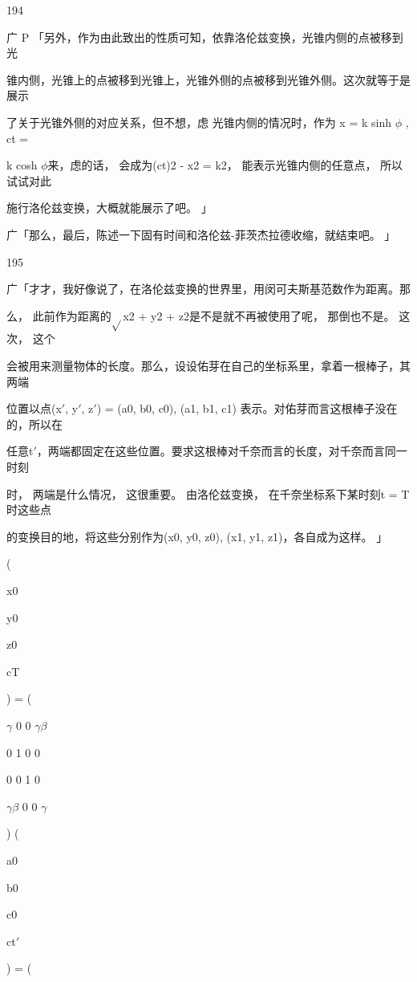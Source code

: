 194\par
广 P 「另外，作为由此致出的性质可知，依靠洛伦兹变换，光锥内侧的点被移到光\par
锥内侧，光锥上的点被移到光锥上，光锥外侧的点被移到光锥外侧。这次就等于是展示\par
了关于光锥外侧的对应关系，但不想，虑 光锥内侧的情况时，作为 x = k sinh $\phi$ , ct =\par
k cosh $\phi$来，虑的话， 会成为(ct)2 - x2 = k2， 能表示光锥内侧的任意点， 所以试试对此\par
施行洛伦兹变换，大概就能展示了吧。 」\par
广「那么，最后，陈述一下固有时间和洛伦兹-菲茨杰拉德收缩，就结束吧。 」\par

195\par
广「才才，我好像说了，在洛伦兹变换的世界里，用闵可夫斯基范数作为距离。那\par
么， 此前作为距离的$\sqrt{}$x2 + y2 + z2是不是就不再被使用了呢， 那倒也不是。 这次， 这个\par
会被用来测量物体的长度。那么，设设佑芽在自己的坐标系里，拿着一根棒子，其两端\par
位置以点(x$\prime$, y$\prime$, z$\prime$) = (a0, b0, c0), (a1, b1, c1) 表示。对佑芽而言这根棒子没在的，所以在\par
任意t$\prime$，两端都固定在这些位置。要求这根棒对千奈而言的长度，对千奈而言同一时刻\par
时， 两端是什么情况， 这很重要。 由洛伦兹变换， 在千奈坐标系下某时刻t = T时这些点\par
的变换目的地，将这些分别作为(x0, y0, z0), (x1, y1, z1)，各自成为这样。 」\par
(\par
x0\par
y0\par
z0\par
cT\par
) = (\par
$\gamma$ 0 0 $\gamma$$\beta$\par
0 1 0 0\par
0 0 1 0\par
$\gamma$$\beta$ 0 0 $\gamma$\par
) (\par
a0\par
b0\par
c0\par
ct$\prime$\par
) = (\par

